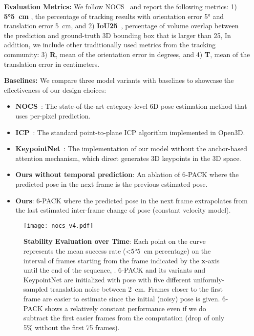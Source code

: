 \documentclass[letterpaper, 10 pt, conference]{ieeeconf}
\newcommand{\methodname}{\textsc{6-PACK}\xspace}
\begin{document}
\textbf{Evaluation Metrics:}
We follow NOCS~\cite{wang2019normalized}  and report the following metrics: 1) \textbf{\ang{5}\SI{5}{\centi\meter}} \cite{lin2014microsoft, li2018deepim}, the percentage of tracking results with orientation error  \ang{5} and translation error  \SI{5}{\centi\meter}, and 2) \textbf{IoU25}~\cite{geiger2013vision}, percentage of volume overlap between the prediction and ground-truth 3D bounding box that is larger than 25, 
In addition, we include other traditionally used metrics from the tracking community: 3) \textbf{R}, mean of the orientation error in degrees, and 4) \textbf{T}, mean of the translation error in centimeters.

\textbf{Baselines:}
We compare three model variants with baselines to showcase the effectiveness of our design choices:
\begin{itemize}
    \item \textbf{NOCS}~\cite{wang2019normalized}: The state-of-the-art category-level 6D pose estimation method that uses per-pixel prediction.
    \item \textbf{ICP}~\cite{Zhou2018}: The standard point-to-plane ICP algorithm implemented in Open3D.
    \item \textbf{KeypointNet}~\cite{suwajanakorn2018discovery}: The implementation of our model without the anchor-based attention mechanism, which direct generates 3D keypoints in the 3D space.
    \item \textbf{Ours without temporal prediction}: An ablation of \methodname{} where the predicted pose in the next frame is the previous estimated pose.
    \item \textbf{Ours}: \methodname{} where the predicted pose in the next frame extrapolates from the last estimated inter-frame change of pose (constant velocity model).
\end{itemize}

\begin{figure}[tb]
\center
\texttt{[image: nocs\_v4.pdf]}
\vspace{-2mm}
\caption{\textbf{Stability Evaluation over Time}: Each point on the curve represents the mean success rate (\textless \ang{5}\SI{5}{\centi\meter} percentage) on the interval of frames starting from the frame indicated by the \textbf{x}-axis until the end of the sequence, . 6-PACK and its variants and KeypointNet are initialized with pose with five different uniformly-sampled translation noise between \SI{2}{\centi\meter}. Frames closer to the first frame are easier to estimate since the initial (noisy) pose is given. \methodname{} shows a relatively constant performance even if we do subtract the first easier frames from the computation (drop of only 5\% without the first 75 frames).}
\label{fig:nocs_plot}
\vspace{-3mm}
\end{figure}
\end{document}
